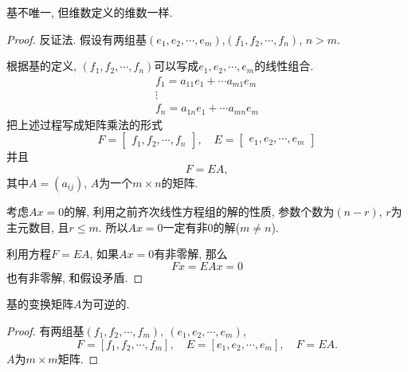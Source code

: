 基不唯一, 但维数定义的维数一样.
\begin{proof}
    反证法. 假设有两组基$(e_1,e_2,\cdots,e_m)$,$(f_1,f_2,\cdots,f_n)$, $n>m$.
     
    根据基的定义, $(f_1,f_2,\cdots,f_n)$可以写成$e_1,e_2,\cdots,e_m$的线性组合.
    \begin{equation}
      \begin{matrix}
        f_1 = a_{11}e_1
        + \cdots a_{m1} e_m
        \\
        \vdots
        \\
        f_n = a_{1n}e_1
        + \cdots a_{mn} e_m
      \end{matrix}
    \end{equation}
    把上述过程写成矩阵乘法的形式
    \begin{equation}
      F = \begin{bmatrix} f_1, f_2, \cdots, f_n \end{bmatrix},\quad E = \begin{bmatrix} e_1, e_2, \cdots, e_m \end{bmatrix}
    \end{equation}
    并且
    \begin{equation}
      F = EA,
    \end{equation}
    其中$A = (a_{ij})$, $A$为一个$m \times n$的矩阵.

    考虑$Ax = 0$的解, 利用之前齐次线性方程组的解的性质, 参数个数为$(n-r)$, $r$为主元数目, 且$r \le m$.
    所以$Ax=0$一定有非$0$的解($m\neq n$).

    利用方程$F=EA$, 如果$Ax=0$有非零解, 那么
    \begin{equation}
      Fx=EAx = 0
    \end{equation}
    也有非零解, 和假设矛盾.
\end{proof}

基的变换矩阵$A$为可逆的.
\begin{proof}
    有两组基$(f_1,f_2,\cdots,f_m), \ (e_1,e_2,\cdots,e_m)$, 
    \begin{equation}
      F = [f_1,f_2,\cdots,f_m], \quad E = [e_1,e_2,\cdots,e_m], \quad F=EA.
    \end{equation}
    $A$为$m \times m$矩阵.
\end{proof}